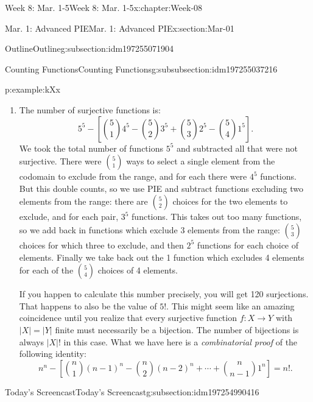 \documentclass[oneside,10pt,]{book}
\numberwithin{equation}{section}
\newcommand{\card}[1]{\left| #1 \right|}
\begin{document}
\begin{chapterptx}{Week 8: Mar. 1-5}{}{Week 8: Mar. 1-5}{}{}{x:chapter:Week-08}
\begin{sectionptx}{Mar. 1: Advanced PIE}{}{Mar. 1: Advanced PIE}{}{}{x:section:Mar-01}
\begin{subsectionptx}{Outline}{}{Outline}{}{}{g:subsection:idm197255071904}
\begin{subsubsectionptx}{Counting Functions}{}{Counting Functions}{}{}{g:subsubsection:idm197255037216}
\begin{example}{}{p:example:kXx}
\begin{enumerate}
\begin{equation*}
{4 \choose 1}3^5 - {4 \choose 2}2^5 + {4 \choose 3}1^5\text{.}
\end{equation*}
We can now say that the number of functions which are surjective is:%
\begin{equation*}
4^5 - \left[{4 \choose 1}3^5 - {4 \choose 2}2^5 + {4 \choose 3}1^5\right]\text{.}
\end{equation*}
%
\item{}The number of surjective functions is:%
\begin{equation*}
5^5 - \left[{5 \choose 1}4^5 - {5 \choose 2}3^5 + {5 \choose 3}2^5 - {5 \choose 4}1^5\right]\text{.}
\end{equation*}
We took the total number of functions \(5^5\) and subtracted all that were not surjective. There were \({5 \choose 1}\) ways to select a single element from the codomain to exclude from the range, and for each there were \(4^5\) functions. But this double counts, so we use PIE and subtract functions excluding two elements from the range: there are \({5 \choose 2}\) choices for the two elements to exclude, and for each pair, \(3^5\) functions. This takes out too many functions, so we add back in functions which exclude 3 elements from the range: \({5 \choose 3}\) choices for which three to exclude, and then \(2^5\) functions for each choice of elements. Finally we take back out the 1 function which excludes 4 elements for each of the \({5 \choose 4}\) choices of 4 elements.%
\par
If you happen to calculate this number precisely, you will get 120 surjections. That happens to also be the value of \(5!\). This might seem like an amazing coincidence until you realize that every surjective function \(f:X \to Y\) with \(\card{X} = \card{Y}\) finite must necessarily be a bijection. The number of bijections is always \(\card{X}!\) in this case. What we have here is a \emph{combinatorial proof} of the following identity:%
\begin{equation*}
n^n - \left[{n\choose 1}(n-1)^n - {n \choose 2}(n-2)^n + \cdots + {n \choose n-1}1^n \right] = n!\text{.}
\end{equation*}
%
\end{enumerate}
%
\end{example}
\end{subsubsectionptx}
\end{subsectionptx}
%
%
\typeout{************************************************}
\typeout{************************************************}
%
\begin{subsectionptx}{Today's Screencast}{}{Today's Screencast}{}{}{g:subsection:idm197254990416}

\end{subsectionptx}
\end{sectionptx}
\end{chapterptx}
\end{document}
